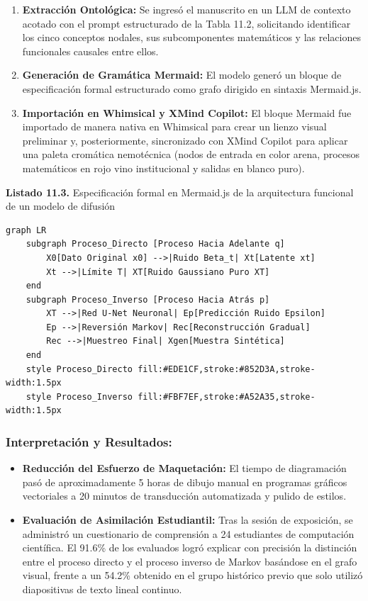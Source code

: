 \begin{enumerate}
    \item \textbf{Extracción Ontológica:} Se ingresó el manuscrito en un LLM de contexto acotado con el prompt estructurado de la Tabla 11.2, solicitando identificar los cinco conceptos nodales, sus subcomponentes matemáticos y las relaciones funcionales causales entre ellos.
    \item \textbf{Generación de Gramática Mermaid:} El modelo generó un bloque de especificación formal estructurado como grafo dirigido en sintaxis Mermaid.js.
    \item \textbf{Importación en Whimsical y XMind Copilot:} El bloque Mermaid fue importado de manera nativa en Whimsical para crear un lienzo visual preliminar y, posteriormente, sincronizado con XMind Copilot para aplicar una paleta cromática nemotécnica (nodos de entrada en color arena, procesos matemáticos en rojo vino institucional y salidas en blanco puro).
\end{enumerate}

\begin{tcolorbox}[colback=white, colframe=unmsm_gold, arc=3pt, boxrule=0.8pt, top=0.3cm, bottom=0.3cm, left=0.4cm, right=0.4cm]
\small\sffamily
\textbf{Listado 11.3.} Especificación formal en Mermaid.js de la arquitectura funcional de un modelo de difusión
\vspace{0.2cm}
\begin{verbatim}
graph LR
    subgraph Proceso_Directo [Proceso Hacia Adelante q]
        X0[Dato Original x0] -->|Ruido Beta_t| Xt[Latente xt]
        Xt -->|Límite T| XT[Ruido Gaussiano Puro XT]
    end
    subgraph Proceso_Inverso [Proceso Hacia Atrás p]
        XT -->|Red U-Net Neuronal| Ep[Predicción Ruido Epsilon]
        Ep -->|Reversión Markov| Rec[Reconstrucción Gradual]
        Rec -->|Muestreo Final| Xgen[Muestra Sintética]
    end
    style Proceso_Directo fill:#EDE1CF,stroke:#852D3A,stroke-width:1.5px
    style Proceso_Inverso fill:#FBF7EF,stroke:#A52A35,stroke-width:1.5px
\end{verbatim}
\end{tcolorbox}

\subsubsection*{Interpretación y Resultados:}
\begin{itemize}
    \item \textbf{Reducción del Esfuerzo de Maquetación:} El tiempo de diagramación pasó de aproximadamente 5 horas de dibujo manual en programas gráficos vectoriales a 20 minutos de transducción automatizada y pulido de estilos.
    \item \textbf{Evaluación de Asimilación Estudiantil:} Tras la sesión de exposición, se administró un cuestionario de comprensión a 24 estudiantes de computación científica. El 91.6\% de los evaluados logró explicar con precisión la distinción entre el proceso directo y el proceso inverso de Markov basándose en el grafo visual, frente a un 54.2\% obtenido en el grupo histórico previo que solo utilizó diapositivas de texto lineal continuo.
\end{itemize}

